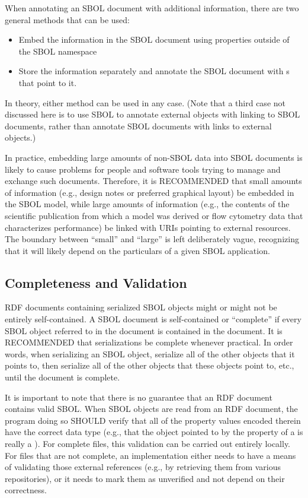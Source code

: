 When annotating an SBOL document with additional information, there are
two general methods that can be used:
\begin{itemize}
\item Embed the information in the SBOL document using properties outside of the SBOL namespace
\item Store the information separately and annotate the SBOL document with s that point to it.
\end{itemize}
In theory, either method can be used in any case. (Note that a third case not
discussed here is to use SBOL to annotate external objects with linking
to SBOL documents, rather than annotate SBOL documents with links to external objects.)

In practice, 
embedding large amounts of non-SBOL data into SBOL documents is likely
to cause problems for people and software tools trying to manage and
exchange such documents.  Therefore, it is RECOMMENDED that small amounts of information (e.g., design notes or preferred graphical layout) be embedded in the SBOL model, while large amounts of information (e.g., the contents of the scientific publication from which a model was derived or flow cytometry data that characterizes performance) be linked with URIs pointing to external resources.  The boundary between ``small'' and ``large'' is left deliberately vague, recognizing that it will likely depend on the particulars of a given SBOL application.

\subsection{Completeness and Validation}

RDF documents containing serialized SBOL objects might or might not be
entirely self-contained.  A SBOL document is self-contained or ``complete'' if every SBOL object referred to in the document is contained in the document.  It is RECOMMENDED that serializations be complete whenever practical.  In order words, when serializing an SBOL object, serialize all of the other objects that it points to, then serialize all of the other objects that these objects point to, etc., until the document is complete.

It is important to note that there is no guarantee that an RDF document
contains valid SBOL. When SBOL objects are read from an RDF document,
 the program doing so SHOULD verify that all of the property
values encoded therein have the correct data type (e.g., that the object
pointed to by the  property of a
 is really a ).
For complete files, this validation can be carried out entirely locally. For files that are not complete, an implementation either needs to
have a means of validating those external references (e.g., by
retrieving them from various repositories), or it needs to mark them as
unverified and not depend on their correctness.

